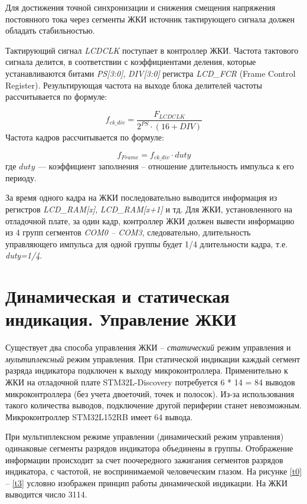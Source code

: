Для достижения точной синхронизации и снижения смещения напряжения постоянного тока через сегменты ЖКИ источник тактирующего сигнала должен обладать стабильностью. 

Тактирующий сигнал \textit{LCDCLK} поступает в контроллер ЖКИ. Частота тактового сигнала делится, в соответствии с коэффициентами деления, которые устанавливаются битами \textit{PS[3:0]}, \textit{DIV[3:0]} регистра \textit{LCD\_FCR }(Frame Control Register). Результирующая частота на выходе блока делителей частоты рассчитывается по формуле:


\[f_{ck\_div}=\frac{F_{LCDCLK}}{2^{PS}\cdot(16+DIV)}\]
Частота кадров рассчитывается по формуле:

\[ f_{Frame}=f_{ck\_div}\cdot duty\]
где $duty$ --- коэффициент заполнения -- отношение длительность импульса к его периоду. 

За время одного кадра на ЖКИ последовательно выводится информация из регистров \textit{LCD\_RAM[x]}, \textit{LCD\_RAM[x+1]} и тд. Для ЖКИ, установленного на отладочной плате, за один кадр, контроллер ЖКИ должен вывести информацию из 4 групп сегментов \textit{COM0 -- COM3}, следовательно, длительность управляющего импульса для одной группы будет 1/4 длительности кадра, т.е. \textit{duty=1/4}. 

\section{Динамическая и статическая индикация. Управление ЖКИ}

Существует два способа управления ЖКИ -- \textit{статический} режим управления и \textit{мультиплексный} режим управления. При статической индикации каждый сегмент разряда индикатора подключен к выходу микроконтроллера. Применительно к ЖКИ на отладочной плате STM32L-Discovery потребуется 6 * 14 = 84 выводов микроконтроллера (без учета двоеточий, точек и полосок). Из-за использования такого количества выводов, подключение другой периферии станет невозможным. Микроконтроллер STM32L152RB имеет 64 вывода.
	
	При мультиплексном режиме управлении (динамический режим управления) одинаковые сегменты разрядов индикатора объединены в группы. Отображение информации происходит за счет поочередного зажигания сегментов разрядов индикатора, с частотой, не воспринимаемой человеческим глазом. На рисунке \ref{t0} -- \ref{t3} условно изображен принцип работы динамической индикации. На ЖКИ выводится число 3114.



